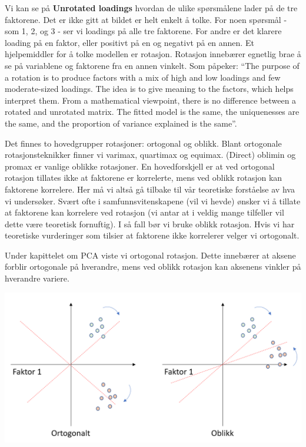 \documentclass[
]{article}
\begin{document}
Vi kan se på \textbf{Unrotated loadings} hvordan de ulike spørsmålene lader på de tre faktorene. Det er ikke gitt at bildet er helt enkelt å tolke. For noen spørsmål - som 1, 2, og 3 - ser vi loadings på alle tre faktorene. For andre er det klarere loading på en faktor, eller positivt på en og negativt på en annen. Et hjelpemiddler for å tolke modellen er rotasjon. Rotasjon innebærer egnetlig brae å se på variablene og faktorene fra en annen vinkelt. Som \citet{hartmannELearningProjectSOGA2018} påpeker: ``The purpose of a rotation is to produce factors with a mix of high and low loadings and few moderate-sized loadings. The idea is to give meaning to the factors, which helps interpret them. From a mathematical viewpoint, there is no difference between a rotated and unrotated matrix. The fitted model is the same, the uniquenesses are the same, and the proportion of variance explained is the same''.

Det finnes to hovedgrupper rotasjoner: ortogonal og oblikk. Blant ortogonale rotasjonsteknikker finner vi varimax, quartimax og equimax. (Direct) oblimin og promax er vanlige oblikke rotasjoner. En hovedforskjell er at ved ortogonal rotasjon tillates ikke at faktorene er korrelerte, mens ved oblikk rotasjon kan faktorene korrelere. Her må vi altså gå tilbake til vår teoretiske forståelse av hva vi undersøker. Svært ofte i samfunnsvitenskapene (vil vi hevde) ønsker vi å tillate at faktorene kan korrelere ved rotasjon (vi antar at i veldig mange tilfeller vil dette være teoretisk fornuftig). I så fall bør vi bruke oblikk rotasjon. Hvis vi har teoretiske vurderinger som tilsier at faktorene ikke korrelerer velger vi ortogonalt.

Under kapittelet om PCA viste vi ortogonal rotasjon. Dette innebærer at aksene forblir ortogonale på hverandre, mens ved oblikk rotasjon kan aksenens vinkler på hverandre variere.

\includegraphics{faktoranalyse7.png}
\end{document}
